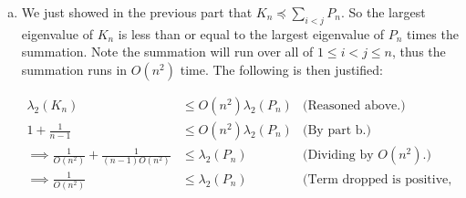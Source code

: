 \documentclass[10pt]{article}
\newcommand{\1}{\vec{\mathbbm{1}}}
\begin{document}
{\begin{enumerate}[(a)]
    \begin{align}
        &\textbf{x}^TL_{G_{ij}}\textbf{x}\nonumber\\ &= \sum_{(u, v) \in E} (\textbf{x}(u) - \textbf{x}(v))^2 &\text{(Given.)}\nonumber\\
        &= (\textbf{x}(i) - \textbf{x}(j))^2 &\text{($E = \{(i, j)\}$ for $G_{ij}, j > i$.)}\nonumber\\
        &= (\textbf{x}(i) - \textbf{x}(i+1) + \textbf{x}(i+1) - \textbf{x}(i+2) + ... + \textbf{x}(j-1) + \textbf{x}(j))^2 &\text{(Adding zeros in form $\textbf{x}(k) - \textbf{x}(k)$.)}\nonumber\\
        &\leq \Big( \sum_{k = i}^j\textbf{x}(k) - \textbf{x}(k+1)\Big)^2 &\text{(Triangle inequality.)}\nonumber\\
        &= \Big( \sum_{k = i}^j \boldsymbol{\Delta}\Big)^2 &(\boldsymbol{\Delta} := \textbf{x}(k) - \textbf{x}(k+1).)\nonumber\\
        &= (\1_{j - i}^T\boldsymbol{\Delta})^2 &\text{(Another way to sum over vector.)}\nonumber\\
        &\leq \lVert \1_{j - i}^T\rVert^2 \lVert \boldsymbol{\Delta}\rVert ^2 &\text{(Cauchy-Schwartz.)}\nonumber\\
        &= (j - i)\sum_{k = i}^j (\textbf{x}(k+1) - \textbf{x}(k))^2 &\text{(Taking 2-norm.)}\nonumber\\
        &\leq (j - i)\sum_{k = 1}^{n-1} (\textbf{x}(k+1) - \textbf{x}(k))^2 &\text{(Adding positive terms.)}\nonumber\\
        &= (j - i) \textbf{x}^TL_{P_n}\textbf{x} &\text{(Definition.)}\nonumber
    \end{align}

    Thus, by the given equality of complete paths, summing over $i, j$ with $j > i$ will yield the desired inequality. \hfill $\square$

    \item We just showed in the previous part that $K_n \preceq \sum_{i < j} P_n$. So the largest eigenvalue of $K_n$ is less than or equal to the largest eigenvalue of $P_n$ times the summation. Note the summation will run over all of $1 \leq i < j \leq n$, thus the summation runs in $O(n^2)$ time. The following is then justified:

    \begin{align}
        \lambda_2(K_n) &\leq O(n^2)\lambda_2(P_n) &\text{(Reasoned above.)}\nonumber\\
        1 +\frac{1}{n - 1} &\leq O(n^2)\lambda_2(P_n) &\text{(By part b.)}\nonumber\\
        \implies \frac{1}{O(n^2)} + \frac{1}{(n - 1)O(n^2)}& \leq \lambda_2(P_n) &\text{(Dividing by $O(n^2)$.)}\nonumber\\
        \implies \frac{1}{O(n^2)} & \leq \lambda_2(P_n) &\text{(Term dropped is positive, so is upper bound.)}\nonumber
    \end{align}


\end{enumerate}}
\end{document}
